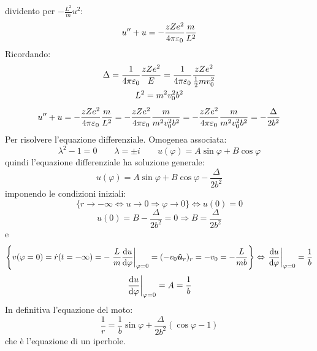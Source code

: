 dividento per $-\frac{L^2}{m}u^2$:
\begin{equation}
	u''+u=-\frac{zZe^2}{4\pi\varepsilon_0}\frac{m}{L^2}
\end{equation}
Ricordando:
\begin{gather*}
	\Delta=\frac{1}{4\pi\varepsilon_0}\frac{zZe^2}{E}=\frac{1}{4\pi\varepsilon_0}\frac{zZe^2}{\frac{1}{2}mv_0^2}\\
	L^2=m^2v_0^2b^2
\end{gather*}
\begin{equation}
	u''+u=-\frac{zZe^2}{4\pi\varepsilon_0}\frac{m}{L^2}=-\frac{zZe^2}{4\pi\varepsilon_0}\frac{m}{m^2v_0^2b^2}=-\frac{zZe^2}{4\pi\varepsilon_0}\frac{m}{m^2v_0^2b^2}=-\frac{\Delta}{2b^2}
\end{equation}
Per risolvere l'equazione differenziale. Omogenea associata:
\[
	\lambda^2-1=0\qquad \lambda=\pm i\qquad u(\varphi)=A\sin\varphi+B\cos\varphi
\]
quindi l'equazione differenziale ha soluzione generale:
\begin{equation}
	u(\varphi)=A\sin\varphi+B\cos\varphi-\frac{\Delta}{2b^2}
\end{equation}
imponendo le condizioni iniziali:
\begin{equation}
	\{r\to-\infty\Leftrightarrow u\to 0\Rightarrow\varphi\to 0\}\Leftrightarrow u(0)=0
\end{equation}
\begin{equation}
	u(0)=B-\frac{\Delta}{2b^2}=0\Rightarrow B=\frac{\Delta}{2b^2}
\end{equation}
e
\begin{equation}
	\left\{v(\varphi=0)=\dot r(t=-\infty)=-\left.\frac{L}{m}\frac{\mathrm{d} u}{\mathrm{d} \varphi}\right|_{\varphi=0}=(-v_0\boldsymbol{\hat {u}}_r)_r=-v_0=-\frac{L}{mb}\right\}\Leftrightarrow
	\left.\frac{\mathrm{d} u}{\mathrm{d} \varphi}\right|_{\varphi=0}=\frac{1}{b}
\end{equation}
\begin{equation}
	\left.\frac{\mathrm{d} u}{\mathrm{d} \varphi}\right|_{\varphi=0}=A=\frac{1}{b}
\end{equation}
In definitiva l'equazione del moto:
\begin{equation}
	\frac{1}{r}=\frac{1}{b}\sin\varphi+\frac{\Delta}{2b^2}\left(\cos\varphi-1\right)
\end{equation}
che è l'equazione di un iperbole.
%  
